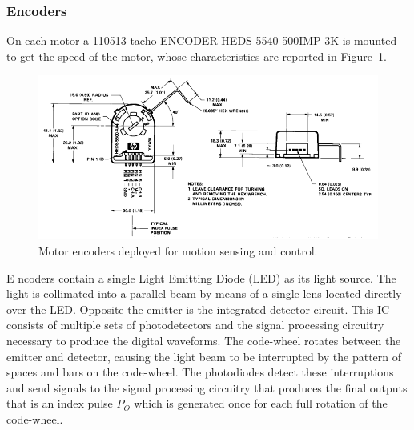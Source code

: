 \subsubsection{Encoders}
On each motor a 110513 tacho ENCODER HEDS 5540 500IMP 3K is mounted to get the speed of the motor, whose characteristics are reported in Figure~\ref{enc}.
\begin{figure}[htbp]
	\centering
	\includegraphics[draft=false,width=\textwidth]{images/03-foundation/enc}
	\caption{Motor encoders deployed for motion sensing and control.}
	\label{enc} 
\end{figure}
E
ncoders contain a single Light Emitting Diode (LED) as its light source. The light is collimated into a parallel beam by means of a single lens located directly over the LED. Opposite the emitter is the integrated detector circuit. This IC consists of multiple sets of photodetectors and the signal processing circuitry necessary to produce the digital waveforms. The code-wheel rotates between the emitter and detector, causing the light beam to be interrupted by the pattern of spaces and bars on the code-wheel. The photodiodes detect these interruptions and send signals to the signal processing circuitry that produces the final outputs that is an index pulse $P_O$ which is generated once for each full rotation of the code-wheel.